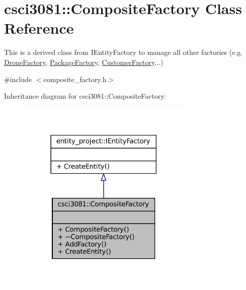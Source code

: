 \hypertarget{classcsci3081_1_1CompositeFactory}{}\section{csci3081\+:\+:Composite\+Factory Class Reference}
\label{classcsci3081_1_1CompositeFactory}


This is a derived class from I\+Entity\+Factory to manage all other factories (e.\+g. \hyperlink{classcsci3081_1_1DroneFactory}{Drone\+Factory}, \hyperlink{classcsci3081_1_1PackageFactory}{Package\+Factory}, \hyperlink{classcsci3081_1_1CustomerFactory}{Customer\+Factory}...)  




{\ttfamily \#include $<$composite\+\_\+factory.\+h$>$}



Inheritance diagram for csci3081\+:\+:Composite\+Factory\+:
\nopagebreak
\begin{figure}[H]
\begin{center}
\leavevmode
\includegraphics[width=237pt]{classcsci3081_1_1CompositeFactory__inherit__graph}
\end{center}
\end{figure}
